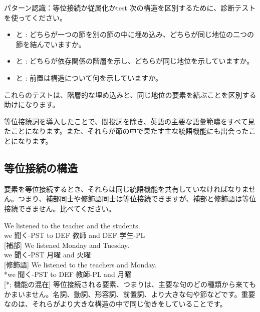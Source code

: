 \begin{tblsframedsymbol}{パターン認識：等位接続か従属化か}{test}
次の構造を区別するために、診断テストを使ってください。
\begin{itemize}[noitemsep, leftmargin=*]
    \item {} と : どちらが一つの節を別の節の中に埋め込み、どちらが同じ地位の二つの節を結んでいますか。
    \item {} と : どちらが依存関係の階層を示し、どちらが同じ地位を示していますか。
    \item {} と : 前置は構造について何を示していますか。
\end{itemize}
これらのテストは、階層的な埋め込みと、同じ地位の要素を結ぶことを区別する助けになります。
\end{tblsframedsymbol}

等位接続詞を導入したことで、間投詞を除き、英語の主要な語彙範疇をすべて見たことになります。また、それらが節の中で果たす主な統語機能にも出会ったことになります。

\subsection{等位接続の構造}

要素を等位接続するとき、それらは同じ統語機能を共有していなければなりません。つまり、補部同士や修飾語同士は等位接続できますが、補部と修飾語は等位接続できません。比べてください。

\ea \label{ex:coord-function-ja}
    \ea \gll We listened {\ob}to the teacher{\cb} {\ob}and the students{\cb}.\\
        we 聞く-PST to DEF 教師 and DEF 学生-PL\\
    \glt {} [補部]
    \ex \gll We listened {\ob}Monday{\cb} and {\ob}Tuesday{\cb}.\\
        we 聞く-PST 月曜 and 火曜\\
    \glt {} [修飾語]
    \ex \gll *We listened {\ob}to the teachers{\cb} and {\ob}Monday{\cb}.\\
        *we 聞く-PST to DEF 教師-PL and 月曜\\
    \glt {} [*; 機能の混在]
    \z
\z
等位接続される要素、つまりは、主要な句のどの種類から来てもかまいません。名詞、動詞、形容詞、前置詞、より大きな句や節などです。重要なのは、それらがより大きな構造の中で同じ働きをしていることです。

